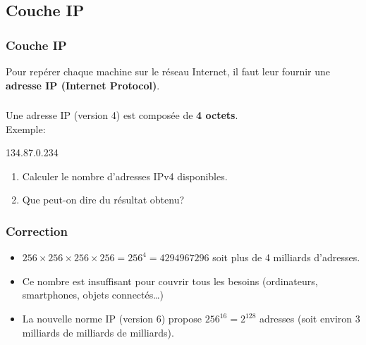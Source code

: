 \documentclass[svgnames,11pt]{beamer}
\begin{document}
\subsection{Couche IP}
\begin{frame}
    \frametitle{Couche IP}

    \begin{aretenir}[]
        Pour repérer chaque machine sur le réseau Internet, il faut leur fournir une \textbf{adresse IP (Internet Protocol)}.
    \end{aretenir}

\end{frame}
\begin{frame}
    \frametitle{}

    \begin{aretenir}[]
        Une adresse IP (version 4) est composée de \textbf{4 octets}. \\Exemple:
        \begin{center}
            134.87.0.234
        \end{center}
    \end{aretenir}
    \begin{activite}
        \begin{enumerate}
            \item Calculer le nombre d'adresses IPv4 disponibles.
            \item Que peut-on dire du résultat obtenu?
        \end{enumerate}
    \end{activite}

\end{frame}
\begin{frame}
    \frametitle{Correction}

    \begin{itemize}
        \item<1-> $256×256×256×256=256^4=4294967296$ soit plus de 4 milliards d'adresses.
        \item <2-> Ce nombre est insuffisant pour couvrir tous les besoins (ordinateurs, smartphones, objets connectés\dots)
        \item<3-> La nouvelle norme IP (version 6) propose $256^{16}=2^{128}$ adresses (soit environ 3 milliards de milliards de milliards).
    \end{itemize}

\end{frame}
\end{document}
